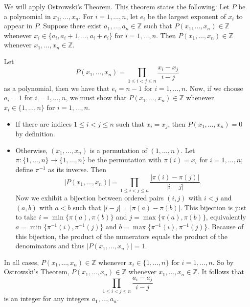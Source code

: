 We will apply Ostrowski's Theorem. This theorem states the following: Let $P$ be a polynomial in $x_1,\ldots,x_n$. For $i=1,\ldots,n$, let $e_i$ be the largest exponent of $x_i$ to appear in $P$. Suppose there exist $a_1,\ldots,a_n\in\mathbb{Z}$ such that $P(x_1,\ldots,x_n)\in\mathbb{Z}$ whenever $x_i\in\{a_i,a_i+1,\ldots,a_i+e_i\}$ for $i=1,\ldots,n$. Then $P(x_1,\ldots,x_n)\in\mathbb{Z}$ whenever $x_1,\ldots,x_n\in\mathbb{Z}$.

Let \[P(x_1,\ldots,x_n)=\prod_{1\leq i<j\leq n}\frac{x_i-x_j}{i-j}\] as a polynomial, then we have that $e_i=n-1$ for $i=1,\ldots,n$. Now, if we choose $a_i=1$ for $i=1,\ldots,n$, we must show that $P(x_1,\ldots,x_n)\in\mathbb{Z}$ whenever $x_i\in\{1,\ldots,n\}$ for $i=1,\ldots,n$.
\begin{itemize}
	\item If there are indices $1\leq i<j\leq n$ such that $x_i=x_j$, then $P(x_1,\ldots,x_n)=0$ by definition. 
	\item Otherwise, $(x_1,\ldots,x_n)$ is a permutation of $(1,\ldots,n)$. Let $\pi:\{1,\ldots,n\}\to\{1,\ldots,n\}$ be the permutation with $\pi(i)=x_i$ for $i=1,\ldots,n$; define $\pi^{-1}$ as its inverse. Then \[|P(x_1,\ldots,x_n)|=\prod_{1\leq i<j\leq n}\frac{|\pi(i)-\pi(j)|}{|i-j|}.\] Now we exhibit a bijection between ordered pairs $(i,j)$ with $i<j$ and $(a,b)$ with $a<b$ such that $|i-j|=|\pi(a)-\pi(b)|$. This bijection is just to take $i=\min\{\pi(a),\pi(b)\}$ and $j=\max\{\pi(a),\pi(b)\}$, equivalently $a=\min\{\pi^{-1}(i),\pi^{-1}(j)\}$ and $b=\max\{\pi^{-1}(i),\pi^{-1}(j)\}$. Because of this bijection, the product of the numerators equals the product of the denominators and thus $|P(x_1,\ldots,x_n)|=1$.
\end{itemize}
In all cases, $P(x_1,\ldots,x_n)\in\mathbb{Z}$ whenever $x_i\in\{1,\ldots,n\}$ for $i=1,\ldots,n$. So by Ostrowski's Theorem, $P(x_1,\ldots,x_n)\in\mathbb{Z}$ whenever $x_1,\ldots,x_n\in\mathbb{Z}$. It follows that \[\prod_{1\leq i<j\leq n}\frac{a_i-a_j}{i-j}\] is an integer for any integers $a_1,\ldots,a_n$.